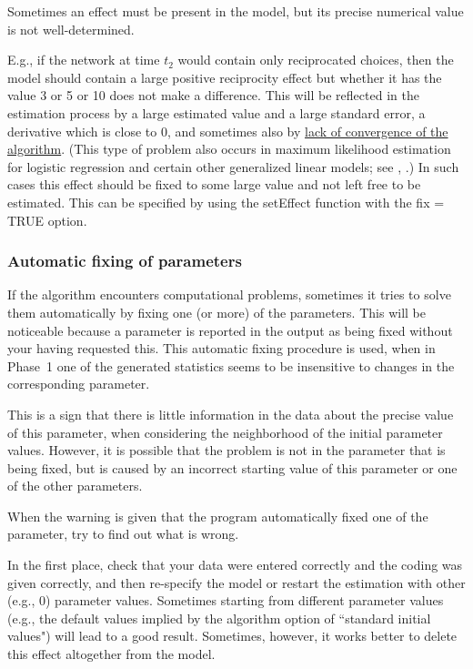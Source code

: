 \documentclass[a4paper,fleqn,11pt]{article}
\newcommand{\+}{\, + \,}
\begin{document}
\hypertarget{T_fix}{Sometimes an effect must be present in the
model, but its precise numerical value is not well-determined.}
E.g., if the network at time $t_2$ would contain only reciprocated
choices, then the model should contain a large positive
reciprocity effect but whether it has the value 3 or 5 or 10 does
not make a difference. This will be reflected in the estimation
process by a large estimated value and a large standard error, a
derivative which is close to 0, and sometimes also by
\hyperlink{T_convergence}{lack of convergence of the algorithm}.
(This type of problem also occurs in maximum likelihood estimation
for logistic regression and certain other generalized linear
models; \label{LargeFix} see \citet[section 1.6]{GeyerThompson92},
\citet{AlbertAnderson84, HauckDonner77}.)
In such cases this effect
should be fixed to some large value and not left free to be
estimated. This can be specified
by using the \textsf{setEffect} function with the
\textsf{fix = TRUE} option.



\subsubsection{Automatic fixing of parameters}
\label{S_fixing}

If the algorithm encounters computational
problems, sometimes it tries to solve them automatically by fixing
one (or more) of the parameters. This will be noticeable because a
parameter is reported in the output as being fixed without your
having requested this. This automatic fixing procedure is used,
when in Phase~1 one of the generated statistics seems to be
insensitive to changes in the corresponding parameter.

This is a sign that there is little information in the data about
the precise value of this parameter, when considering the
neighborhood of the initial parameter values. However, it is
possible that the problem is not in the parameter that is being
fixed, but is caused by an incorrect starting value of this
parameter or one of the other parameters.

When the warning is given that the program automatically fixed one
of the parameter, try to find out what is wrong.

In the first place, check that your data were entered correctly
and the coding was given correctly, and then re-specify the model
or restart the estimation with other (e.g., 0) parameter values.
Sometimes starting from different parameter values (e.g., the
default values implied by the algorithm option
of ``standard initial values") will lead to a good result.
Sometimes, however, it works better to delete this effect
altogether from the model.
\end{document}
